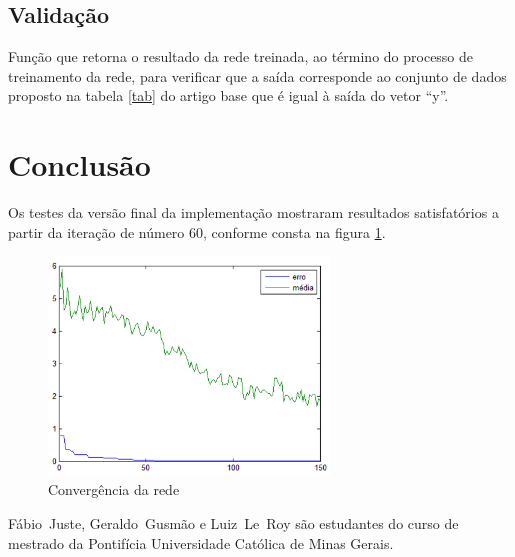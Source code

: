 \documentclass{IEEEtran}
\begin{document}
\subsection{Validação}
	Função que retorna o resultado da rede treinada, ao término do processo de treinamento da  rede, para verificar que a saída corresponde ao conjunto de dados proposto na tabela \ref{tab} do artigo base que é igual à saída do vetor ``y''. 


\section{Conclusão}
Os testes da versão final  da implementação mostraram resultados satisfatórios a partir da iteração de número 60, conforme consta na figura \ref{res}.
\begin{figure}[ht!]
	\centering
	\includegraphics[width=75mm]{res.png}
	\caption{Convergência da rede}
	\label{res}
\end{figure}


\ifCLASSOPTIONcaptionsoff
  \newpage
\fi




\begin{IEEEbiographynophoto}{Fábio~Juste, Geraldo~Gusmão e Luiz~Le~Roy}
são estudantes do curso de mestrado da Pontif\'icia Universidade Cat\'olica de Minas Gerais.
\end{IEEEbiographynophoto}

\end{document}
